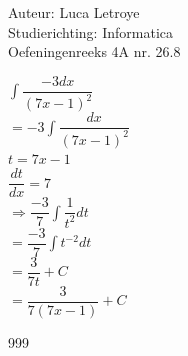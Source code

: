 \documentclass[a4paper]{article}
\begin{document}
  
\noindent \large Auteur: Luca Letroye \\
\noindent \large Studierichting: Informatica\\
\noindent \large Oefeningenreeks 4A nr. 26.8

\medskip
\normalsize

$\displaystyle\int \dfrac{-3dx}{(7x-1)^2} $\\

$ = -3\displaystyle\int \dfrac{dx}{(7x-1)^2} $\\

$t = 7x-1$\\

$\dfrac{dt}{dx} = 7$\\

$ \Rightarrow \dfrac{-3}{7}\displaystyle\int \dfrac{1}{t^2} dt  $\\

$ = \dfrac{-3}{7}\displaystyle\int t^{-2} dt  $\\

$ = \dfrac{3}{7t} +C  $\\

$ = \dfrac{3}{7(7x-1)} +C  $\\





\begin{thebibliography}{999}
\end{thebibliography}
\end{document}
